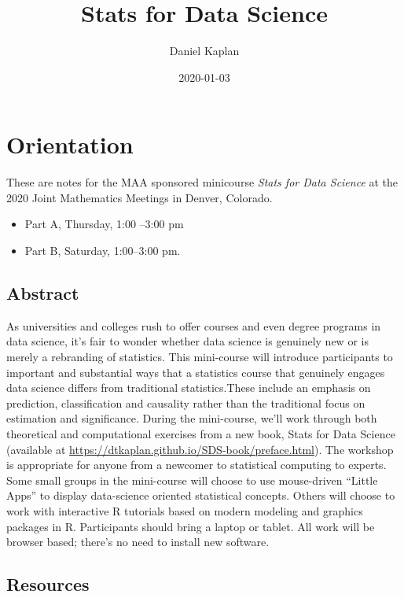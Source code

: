 \documentclass[]{book}
\title{Stats for Data Science}
\author{Daniel Kaplan}
\date{2020-01-03}
\providecommand{\tightlist}{%
  \setlength{\itemsep}{0pt}\setlength{\parskip}{0pt}}
\begin{document}
\maketitle

{
\setcounter{tocdepth}{1}
\tableofcontents
}
\hypertarget{orientation}{%
\chapter*{Orientation}\label{orientation}}

These are notes for the MAA sponsored minicourse \emph{Stats for Data Science} at the 2020 Joint Mathematics Meetings in Denver, Colorado.

\begin{itemize}
\tightlist
\item
  Part A, Thursday, 1:00 --3:00 pm
\item
  Part B, Saturday, 1:00--3:00 pm.
\end{itemize}

\hypertarget{abstract}{%
\section*{Abstract}\label{abstract}}

As universities and colleges rush to offer courses and even degree programs in data science, it's fair to wonder whether data science is genuinely new or is merely a rebranding of statistics. This mini-course will introduce participants to important and substantial ways that a statistics course that genuinely engages data science differs from traditional statistics.These include an emphasis on prediction, classification and causality rather than the traditional focus on estimation and significance. During the mini-course, we'll work through both theoretical and computational exercises from a new book, Stats for Data Science (available at \url{https://dtkaplan.github.io/SDS-book/preface.html}). The workshop is appropriate for anyone from a newcomer to statistical computing to experts. Some small groups in the mini-course will choose to use mouse-driven ``Little Apps'' to display data-science oriented statistical concepts. Others will choose to work with interactive R tutorials based on modern modeling and graphics packages in R. Participants should bring a laptop or tablet. All work will be browser based; there's no need to install new software.

\hypertarget{resources}{%
\section*{Resources}\label{resources}}
\end{document}
